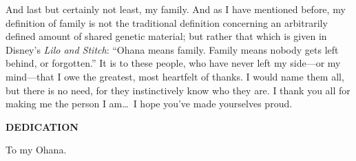 \documentclass[12pt]{report}      %
\newcounter{originalpagenumber}                    %
\begin{document}
	And last but certainly not least, my family. And as I have mentioned before, my definition of family is not the traditional definition concerning an arbitrarily defined amount of shared genetic material; but rather that which is given in Disney's \emph{Lilo and Stitch}: ``Ohana means family. Family means nobody gets left behind, or forgotten.'' It is to these people, who have never left my side---or my mind---that I owe the greatest, most heartfelt of thanks. I would name them all, but there is no need, for they instinctively know who they are. I thank you all for making me the person I am\ldots~I hope you've made yourselves proud.
	\vspace{\fill}
\newpage
\begin{center}
	{\Large\bf{DEDICATION}}
	
	\vspace{\fill}	
	To my Ohana.
	\vspace{\fill}
\end{center}
\newpage
\tableofcontents
\newpage
\listoftables
{}
\listoffigures
{}
\newpage
\setcounter{page}{1}




\setcounter{originalpagenumber}{\number\value{page}} %

\setcounter{page}{\number\value{originalpagenumber}}


\end{document}
